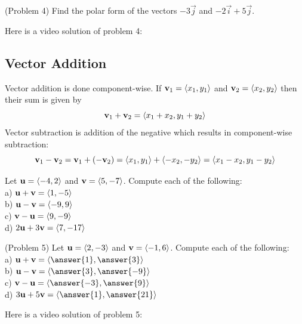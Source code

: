 \documentclass[handout]{ximera}
\begin{document}
\begin{problem}(Problem 4)
Find the polar form of the vectors $-3\vec{j}$ and $-2\vec{i}+5\vec{j}$.\\
\end{problem}

Here is a video solution of problem 4:\\
\begin{foldable}
\end{foldable}

\subsection{Vector Addition}
Vector addition is done component-wise.  If $\mathbf{v}_1 = \left\langle x_1, y_1\right\rangle$ and $\mathbf{v}_2 = \left\langle x_2, y_2\right\rangle$
then their sum is given by
\[
\mathbf{v}_1+ \mathbf{v}_2= \left\langle x_1+x_2,  y_1+y_2\right\rangle
\]
Vector subtraction is addition of the negative which results in component-wise subtraction:
\[
\mathbf{v}_1- \mathbf{v}_2= \mathbf{v}_1+ \left(- \mathbf{v}_2\right)  = \left\langle x_1,y_1\right\rangle + \left\langle -x_2, -y_2\right\rangle = \left\langle x_1-x_2,  y_1-y_2\right\rangle
\]

\begin{example}[Example 5]
Let $\mathbf{u} = \left\langle -4, 2\right\rangle$ and $\mathbf{v} = \left\langle 5, -7\right\rangle$.  Compute each of the following:\\
a) $\mathbf{u}+\mathbf{v} = \left\langle 1, -5\right\rangle$\\
b) $\mathbf{u}-\mathbf{v} = \left\langle -9, 9\right\rangle$\\
c) $\mathbf{v}-\mathbf{u} = \left\langle 9, -9\right\rangle$\\
d) $2\mathbf{u}+3\mathbf{v} = \left\langle 7, -17\right\rangle$\\
\end{example}

\begin{problem}(Problem 5)
Let $\mathbf{u} = \left\langle 2, -3\right\rangle$ and $\mathbf{v} = \left\langle -1, 6\right\rangle$.  Compute each of the following:\\
a) $\vec{u}+\vec{v} = \vector{\answer{1}, \answer{3}}$\\
b) $\vec{u}-\vec{v} = \vector{\answer{3}, \answer{-9}}$\\
c) $\vec{v}-\vec{u} = \vector{\answer{-3}, \answer{9}}$\\
d) $3\vec{u}+5\vec{v} = \vector{\answer{1}, \answer{21}}$\\
\end{problem}

Here is a video solution of problem 5:\\
\begin{foldable}
\end{foldable}
\end{document}
